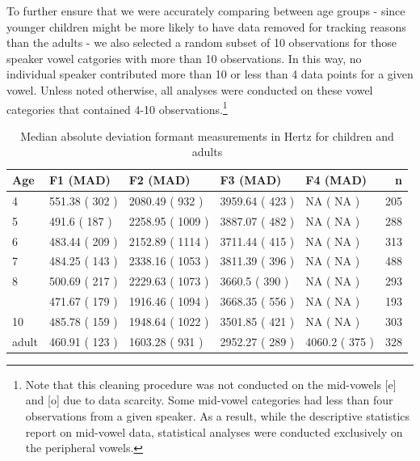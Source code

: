 \documentclass[
]{article}
\begin{document}
To further ensure that we were accurately comparing between age groups - since younger children might be more likely to have data removed for tracking reasons than the adults - we also selected a random subset of 10 observations for those speaker vowel catgories with more than 10 observations. In this way, no individual speaker contributed more than 10 or less than 4 data points for a given vowel. Unless noted otherwise, all analyses were conducted on these vowel categories that contained 4-10 observations.\footnote{Note that this cleaning procedure was not conducted on the mid-vowels {[}e{]} and {[}o{]} due to data scarcity. Some mid-vowel categories had less than four observations from a given speaker. As a result, while the descriptive statistics report on mid-vowel data, statistical analyses were conducted exclusively on the peripheral vowels.}

\begin{table}[!h]

\caption{\label{tab:summary-formant-table}Median absolute deviation formant measurements in Hertz for children and adults}
\centering
\begin{tabular}[t]{lllllr}
\toprule
Age & F1 (MAD) & F2 (MAD) & F3 (MAD) & F4 (MAD) & n\\
\midrule
4 & 551.38 ( 302 ) & 2080.49 ( 932 ) & 3959.64 ( 423 ) & NA ( NA ) & 205\\
5 & 491.6 ( 187 ) & 2258.95 ( 1009 ) & 3887.07 ( 482 ) & NA ( NA ) & 288\\
6 & 483.44 ( 209 ) & 2152.89 ( 1114 ) & 3711.44 ( 415 ) & NA ( NA ) & 313\\
7 & 484.25 ( 143 ) & 2338.16 ( 1053 ) & 3811.39 ( 396 ) & NA ( NA ) & 488\\
8 & 500.69 ( 217 ) & 2229.63 ( 1073 ) & 3660.5 ( 390 ) & NA ( NA ) & 293\\
\addlinespace
9 & 471.67 ( 179 ) & 1916.46 ( 1094 ) & 3668.35 ( 556 ) & NA ( NA ) & 193\\
10 & 485.78 ( 159 ) & 1948.64 ( 1022 ) & 3501.85 ( 421 ) & NA ( NA ) & 303\\
adult & 460.91 ( 123 ) & 1603.28 ( 931 ) & 2952.27 ( 289 ) & 4060.2 ( 375 ) & 328\\
\bottomrule
\end{tabular}
\end{table}
\end{document}
